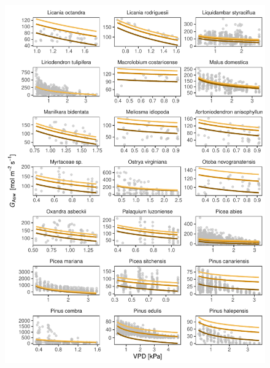 \documentclass[11pt,twoside]{reedthesis}
\begin{document}
\begin{figure}[H]

{\centering \includegraphics[width=1\linewidth]{figure/appendixD/ggg4} 

}

\end{figure}
\end{document}
